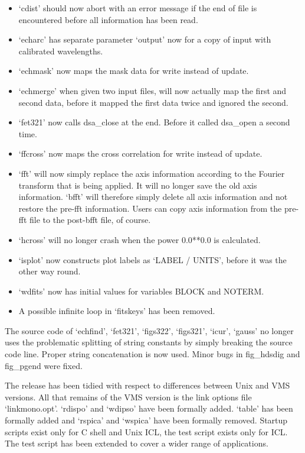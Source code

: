 \documentclass[11pt,twoside]{article}
\begin{document}
\begin{itemize}
\item `cdist' should now abort with an error message if the end of file is
      encountered before all information has been read.
\item `echarc' has separate parameter `output' now for a copy of input with
      calibrated wavelengths.
\item `echmask' now maps the mask data for write instead of update.
\item `echmerge' when given two input files, will now actually map the first
      and second data, before it mapped the first data twice and ignored the
      second.
\item `fet321' now calls dsa\_close at the end.  Before it called dsa\_open a
      second time.
\item `ffcross' now maps the cross correlation for write instead of update.
\item `fft' will now simply replace the axis information according to the
      Fourier transform that is being applied.  It will no longer save the
      old axis information.  `bfft' will therefore simply delete all axis
      information and not restore the pre-fft information.  Users can copy
      axis information from the pre-fft file to the post-bfft file, of
      course.
\item `hcross' will no longer crash when the power 0.0**0.0 is calculated.
\item `isplot' now constructs plot labels as `LABEL / UNITS', before it was
      the other way round.
\item `wdfits' now has initial values for variables BLOCK and NOTERM.
\item A possible infinite loop in `fitskeys' has been removed.
\end{itemize}

   The source code of `echfind', `fet321', `figs322', `figs321',
   `icur', `gauss' no longer uses the problematic splitting of string
   constants by simply breaking the source code line.  Proper string
   concatenation is now used. Minor bugs in fig\_hdsdig and fig\_pgend
   were fixed.

   The release has been tidied with respect to differences between Unix and
   VMS versions.  All that remains of the VMS version is the link options
   file `linkmono.opt'.  `rdispo' and `wdipso' have been formally
   added.  `table' has been formally added and `rspica' and `wspica'
   have been formally removed. Startup scripts exist only for C shell
   and Unix ICL, the test script exists only for ICL.  The test script
   has been extended to cover a wider range of applications.
\end{document}
